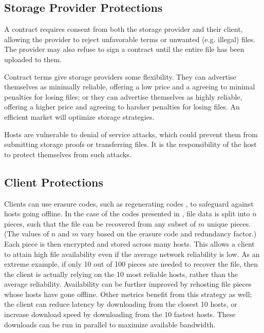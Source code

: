 \documentclass[twocolumn]{article}
\begin{document}
\subsection{Storage Provider Protections}
A contract requires consent from both the storage provider and their client, allowing the provider to reject unfavorable terms or unwanted (e.g. illegal) files.
The provider may also refuse to sign a contract until the entire file has been uploaded to them.

Contract terms give storage providers some flexibility.
They can advertise themselves as minimally reliable, offering a low price and a agreeing to minimal penalties for losing files;
or they can advertise themselves as highly reliable, offering a higher price and agreeing to harsher penalties for losing files.
An efficient market will optimize storage strategies.

Hosts are vulnerable to denial of service attacks, which could prevent them from submitting storage proofs or transferring files.
It is the responsibility of the host to protect themselves from such attacks.

\subsection{Client Protections}
Clients can use erasure codes, such as regenerating codes \cite{reg}, to safeguard against hosts going offline.
In the case of the codes presented in \cite{reg}, file data is split into $n$ pieces, such that the file can be recovered from any subset of $m$ unique pieces.
(The values of $n$ and $m$ vary based on the erasure code and redundancy factor.)
Each piece is then encrypted and stored across many hosts.
This allows a client to attain high file availability even if the average network reliability is low.
As an extreme example, if only 10 out of 100 pieces are needed to recover the file, then the client is actually relying on the 10 most reliable hosts, rather than the average reliability.
Availability can be further improved by rehosting file pieces whose hosts have gone offline.
Other metrics benefit from this strategy as well; the client can reduce latency by downloading from the closest 10 hosts, or increase download speed by downloading from the 10 fastest hosts.
These downloads can be run in parallel to maximize available bandwidth.
\end{document}
